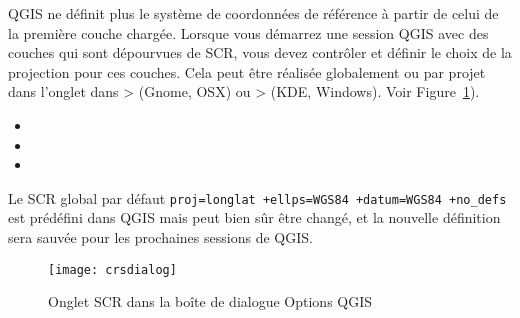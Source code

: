 QGIS ne définit plus le système de coordonnées de référence à partir de 
celui de la première couche chargée. Lorsque vous démarrez
une session QGIS avec des couches qui sont dépourvues de SCR, vous devez
contrôler et définir le choix de la projection pour ces couches. Cela peut
être réalisée globalement ou par projet dans l'onglet  dans 
 >  (Gnome, OSX)
ou  >  (KDE, Windows). 
Voir Figure~\ref{fig:crsdialog}).

\begin{itemize}
\item {}
\item {}
\item {}
\end{itemize}

Le SCR global par défaut \texttt{proj=longlat +ellps=WGS84 +datum=WGS84
 +no\_defs} est prédéfini dans QGIS mais peut bien sûr être changé, et la
nouvelle définition sera sauvée pour les prochaines sessions de QGIS.

\begin{figure}[ht]
   \begin{center}
   \caption{Onglet SCR dans la boîte de dialogue Options QGIS
\nixcaption}\label{fig:crsdialog}\smallskip
   \texttt{[image: crsdialog]}
\end{center}
\end{figure}

